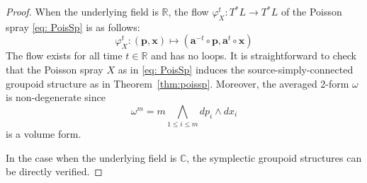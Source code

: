 \documentclass{amsart}
\newcommand{\bfa}{\mathbf{a}}
\newcommand{\bfp}{\mathbf{p}}
\newcommand{\bfx}{\mathbf{x}}
\newcommand{\CC}{\mathbb{C}}
\newcommand{\RR}{\mathbb{R}}
\begin{document}
\begin{proof}
	When the underlying field is $\RR$, the flow $\varphi_X^t: T^*L \to T^*L$ of the Poisson spray \eqref{eq: PoisSp} is as follows:
	$$
		\varphi_X^t: (\bfp, \bfx) \mapsto (\bfa^{-t} \circ \bfp, \bfa^t \circ \bfx)
	$$
The flow exists for all time $t \in \RR$ and has no loops. It is straightforward to check that the Poisson spray $X$ as in \eqref{eq: PoisSp} induces the source-simply-connected groupoid structure as in Theorem~\ref{thm:poissp}. Moreover, the averaged 2-form $\omega$ is non-degenerate since
	$$
		\omega^m = m \bigwedge\limits_{1\leq i\leq m} dp_i \wedge dx_i
	$$
is a volume form.

	In the case when the underlying field is $\CC$, the symplectic groupoid structures can be directly verified.
\end{proof}
\end{document}

